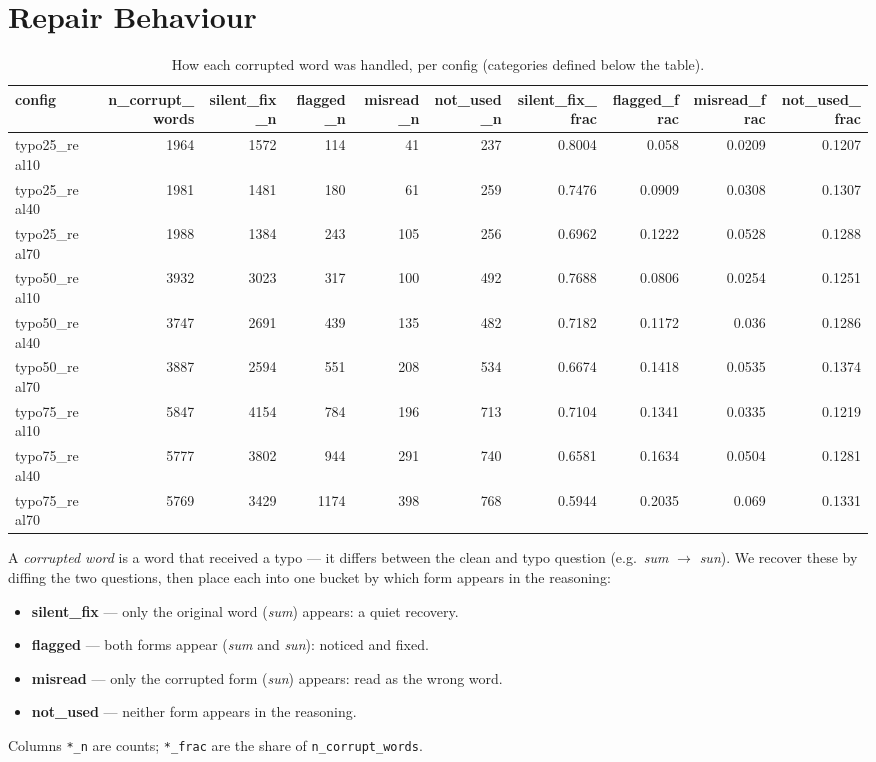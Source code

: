 \documentclass[11pt]{article}
\begin{document}
\section*{Repair Behaviour}
\begin{table}[H]
\centering
\caption{How each corrupted word was handled, per config (categories defined below the table).}
\small
\begin{adjustbox}{max width=\textwidth}
\begin{tabular}{lrrrrrrrrr}
\toprule
\textbf{config} & \textbf{n\_corrupt\_words} & \textbf{silent\_fix\_n} & \textbf{flagged\_n} & \textbf{misread\_n} & \textbf{not\_used\_n} & \textbf{silent\_fix\_frac} & \textbf{flagged\_frac} & \textbf{misread\_frac} & \textbf{not\_used\_frac} \\
\midrule
typo25\_real10 & 1964 & 1572 & 114 & 41 & 237 & 0.8004 & 0.058 & 0.0209 & 0.1207 \\
typo25\_real40 & 1981 & 1481 & 180 & 61 & 259 & 0.7476 & 0.0909 & 0.0308 & 0.1307 \\
typo25\_real70 & 1988 & 1384 & 243 & 105 & 256 & 0.6962 & 0.1222 & 0.0528 & 0.1288 \\
typo50\_real10 & 3932 & 3023 & 317 & 100 & 492 & 0.7688 & 0.0806 & 0.0254 & 0.1251 \\
typo50\_real40 & 3747 & 2691 & 439 & 135 & 482 & 0.7182 & 0.1172 & 0.036 & 0.1286 \\
typo50\_real70 & 3887 & 2594 & 551 & 208 & 534 & 0.6674 & 0.1418 & 0.0535 & 0.1374 \\
typo75\_real10 & 5847 & 4154 & 784 & 196 & 713 & 0.7104 & 0.1341 & 0.0335 & 0.1219 \\
typo75\_real40 & 5777 & 3802 & 944 & 291 & 740 & 0.6581 & 0.1634 & 0.0504 & 0.1281 \\
typo75\_real70 & 5769 & 3429 & 1174 & 398 & 768 & 0.5944 & 0.2035 & 0.069 & 0.1331 \\
\bottomrule
\end{tabular}
\end{adjustbox}
\end{table}

\noindent A \emph{corrupted word} is a word that received a
typo --- it differs between the clean and typo question (e.g.\ \emph{sum} $\to$
\emph{sun}). We recover these by diffing the two questions, then place each into one
bucket by which form appears in the reasoning:
\begin{itemize}\setlength{\itemsep}{1pt}
  \item \textbf{silent\_fix} --- only the original word (\emph{sum}) appears: a quiet recovery.
  \item \textbf{flagged} --- both forms appear (\emph{sum} and \emph{sun}): noticed and fixed.
  \item \textbf{misread} --- only the corrupted form (\emph{sun}) appears: read as the wrong word.
  \item \textbf{not\_used} --- neither form appears in the reasoning.
\end{itemize}
\noindent Columns \texttt{*\_n} are counts; \texttt{*\_frac} are the share of
\texttt{n\_corrupt\_words}.
\medskip
\end{document}
